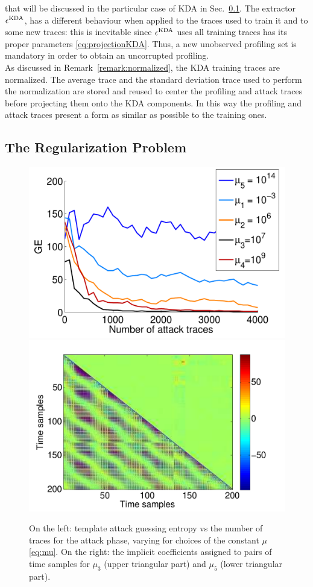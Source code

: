 that will be discussed in the particular case of KDA in Sec.~\ref{sec:mu}. The extractor $\epsilon^{\mathrm{KDA}}$, has a different behaviour when applied to the traces used to train it and to some new traces: this is inevitable since $\epsilon^{\mathrm{KDA}}$ uses all training traces has its proper parameters \eqref{eq:projectionKDA}. Thus, a new unobserved profiling set is mandatory in order to obtain an uncorrupted profiling.
\\

As discussed in Remark~\ref{remark:normalized}, the KDA training traces are normalized. The average trace and the standard deviation trace used to perform the normalization are stored and reused to center the profiling and attack traces before projecting them onto the KDA components. In this way the profiling and attack traces present a form as similar as possible to the training ones.

\subsection{The Regularization Problem}\label{sec:mu}


\begin{figure}
\includegraphics[width=.5\textwidth]{../Figures/CARDIS2016/mu_comparison_new.pdf} 
\includegraphics[width=.5\textwidth]{../Figures/CARDIS2016/good_bad_coeffs.pdf} 
\caption[Dependence of KDA performances on the regularization parameter $\mu$. Implicit coefficients.]{On the left: template attack guessing entropy vs the number of traces for the attack phase, varying for choices of the constant $\mu$  \eqref{eq:mu}. On the right: the implicit coefficients assigned to pairs of time samples for $\mu_3$ (upper triangular part) and $\mu_5$ (lower triangular part). }\label{fig:mu}
\end{figure}



